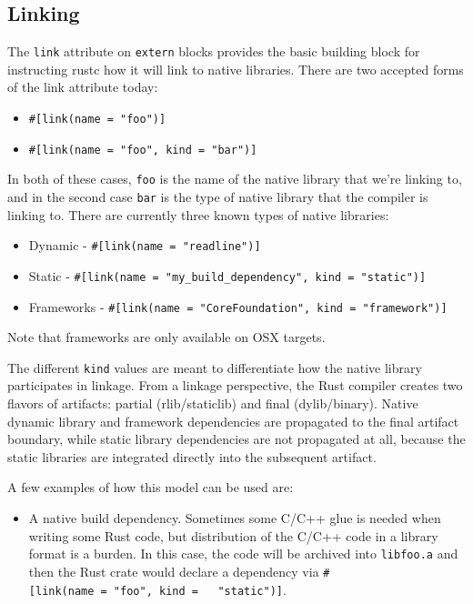 \documentclass[a4paper,]{book}
\providecommand{\tightlist}{%
  \setlength{\itemsep}{0pt}\setlength{\parskip}{0pt}}
\begin{document}
\subsection{Linking}\label{linking}

The \texttt{link} attribute on \texttt{extern} blocks provides the basic
building block for instructing rustc how it will link to native
libraries. There are two accepted forms of the link attribute today:

\begin{itemize}
\tightlist
\item
  \texttt{\#{[}link(name\ =\ "foo"){]}}
\item
  \texttt{\#{[}link(name\ =\ "foo",\ kind\ =\ "bar"){]}}
\end{itemize}

In both of these cases, \texttt{foo} is the name of the native library
that we're linking to, and in the second case \texttt{bar} is the type
of native library that the compiler is linking to. There are currently
three known types of native libraries:

\begin{itemize}
\tightlist
\item
  Dynamic - \texttt{\#{[}link(name\ =\ "readline"){]}}
\item
  Static -
  \texttt{\#{[}link(name\ =\ "my\_build\_dependency",\ kind\ =\ "static"){]}}
\item
  Frameworks -
  \texttt{\#{[}link(name\ =\ "CoreFoundation",\ kind\ =\ "framework"){]}}
\end{itemize}

Note that frameworks are only available on OSX targets.

The different \texttt{kind} values are meant to differentiate how the
native library participates in linkage. From a linkage perspective, the
Rust compiler creates two flavors of artifacts: partial (rlib/staticlib)
and final (dylib/binary). Native dynamic library and framework
dependencies are propagated to the final artifact boundary, while static
library dependencies are not propagated at all, because the static
libraries are integrated directly into the subsequent artifact.

A few examples of how this model can be used are:

\begin{itemize}
\tightlist
\item
  A native build dependency. Sometimes some C/C++ glue is needed when
  writing some Rust code, but distribution of the C/C++ code in a
  library format is a burden. In this case, the code will be archived
  into \texttt{libfoo.a} and then the Rust crate would declare a
  dependency via
  \texttt{\#{[}link(name\ =\ "foo",\ kind\ =\ \ \ "static"){]}}.
\end{itemize}
\end{document}
